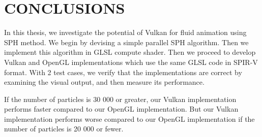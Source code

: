 \documentclass[a4paper, 12pt, oneside]{book}
\begin{document}
\chapter{CONCLUSIONS}
\label{ch:conclusions}

\begin{doublespace}
    In this thesis, we investigate the potential of Vulkan for fluid animation using SPH method. We begin by devising a simple parallel SPH algorithm. Then we implement this algorithm in GLSL compute shader. Then we proceed to develop Vulkan and OpenGL implementations which use the same GLSL code in SPIR-V format. With 2 test cases, we verify that the implementations are correct by examining the visual output, and then measure its performance.
    
    If the number of particles is 30 000 or greater, our Vulkan implementation performs faster compared to our OpenGL implementation. But our Vulkan implementation  performs worse compared to our OpenGL implementation if the number of particles is 20 000 or fewer.
\end{doublespace}

\printbibliography[title={BIBLIOGRAPHY}, heading=bibintoc]
\end{document}
